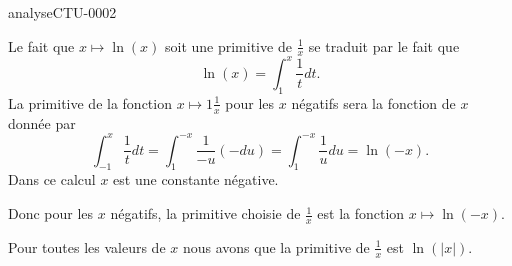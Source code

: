 
\begin{corrige}{analyseCTU-0002}

    Le fait que \( x\mapsto\ln(x)\) soit une primitive de \( \frac{1}{ x }\) se traduit par le fait que
    \begin{equation}
        \ln(x)=\int_1^x\frac{1}{ t }dt.
    \end{equation}
    La primitive de la fonction \( x\mapsto 1\frac{1}{ x }\) pour les \( x\) négatifs sera la fonction de \( x \) donnée par
    \begin{equation}
        \int_{-1}^{x}\frac{1}{ t }dt=\int_1^{-x}\frac{1}{ -u }(-du)=\int_1^{-x}\frac{1}{ u }du=\ln(-x).
    \end{equation}
    Dans ce calcul \( x\) est une constante négative.

    Donc pour les \( x\) négatifs, la primitive choisie de \( \frac{1}{ x }\) est la fonction \( x\mapsto\ln(-x)\).

    Pour toutes les valeurs de \( x\) nous avons que la primitive de \( \frac{1}{ x }\) est \( \ln(| x |)\).

\end{corrige}
